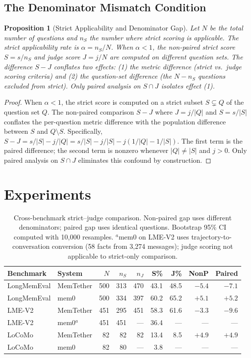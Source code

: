 \documentclass{article}
\newtheorem{proposition}{Proposition}
\begin{document}
\subsection{The Denominator Mismatch Condition}
\begin{proposition}[Strict Applicability and Denominator Gap]
\label{prop:strictgap}
Let $N$ be the total number of questions and $n_S$ the number where strict scoring is applicable. The strict applicability rate is $\alpha = n_S / N$. When $\alpha < 1$, the non-paired strict score $S = s/n_S$ and judge score $J = j/N$ are computed on different question sets. The difference $S - J$ conflates two effects: (1) the metric difference (strict vs.\ judge scoring criteria) and (2) the question-set difference (the $N - n_S$ questions excluded from strict). Only paired analysis on $S \cap J$ isolates effect (1).
\end{proposition}
\begin{proof}
When $\alpha < 1$, the strict score is computed on a strict subset $S \subsetneq Q$ of the question set $Q$. The non-paired comparison $S - J$ where $J = j/|Q|$ and $S = s/|S|$ conflates the per-question metric difference with the population difference between $S$ and $Q \setminus S$. Specifically, $S - J = s/|S| - j/|Q| = s/|S| - j/|S| - j(1/|Q| - 1/|S|)$. The first term is the paired difference; the second term is nonzero whenever $|Q| \neq |S|$ and $j > 0$. Only paired analysis on $S \cap J$ eliminates this confound by construction.
\end{proof}

\section{Experiments}

\begin{table}[t]
\centering
\caption{Cross-benchmark strict--judge comparison. Non-paired gap uses different denominators; paired gap uses identical questions. Bootstrap 95\% CI computed with 10{,}000 resamples. $^a$mem0 on LME-V2 uses trajectory-to-conversation conversion (58 facts from 3{,}274 messages); judge scoring not applicable to strict-only comparison.}
\label{tab:main}
\begin{tabular}{llrrrrrrr}
\toprule
Benchmark & System & $N$ & $n_S$ & $n_J$ & S\% & J\% & NonP & Paired \\
\midrule
LongMemEval & MemTether & 500 & 313 & 470 & 43.1 & 48.5 & $-5.4$ & $-7.1$ \\
LongMemEval & mem0 & 500 & 334 & 397 & 60.2 & 65.2 & $+5.1$ & $+5.2$ \\
LME-V2 & MemTether & 451 & 295 & 451 & 58.3 & 61.6 & $-3.3$ & $-9.6$ \\
LME-V2 & mem0$^a$ & 451 & 451 & --- & 36.4 & --- & --- & --- \\
LoCoMo & MemTether & 82 & 82 & 82 & 13.4 & 8.5 & $+4.9$ & $+4.9$ \\
LoCoMo & mem0 & 82 & 80 & --- & 3.8 & --- & --- & --- \\
\bottomrule
\end{tabular}
\end{table}
\end{document}
